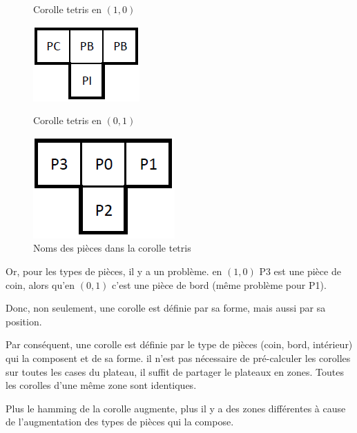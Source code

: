 \begin{exmp}
\begin{figure}[H]
\begin{minipage}{0.33\textwidth}
\begin{center}
					\caption{Corolle tetris en $(1,0)$}\label{fig:corolle_tetris_1}
					\includegraphics{images/corolle_tetris_2.png}
					\caption{Corolle tetris en $(0,1)$}\label{fig:corolle_tetris_2}
				\end{center}
			\end{minipage}\hfill
			\begin{minipage}{0.33\textwidth}
				\includegraphics{images/corolle_tetris.png}
				\caption{Noms des pièces dans la corolle tetris}\label{fig:corolle_tetris}
			\end{minipage}\hfill
		\end{figure}
		
		Or, pour les types de pièces, il y a un problème. en $(1,0)$ P3 est une pièce de coin, alors qu'en $(0,1)$ c'est une pièce de bord (même problème pour P1).
		
		Donc, non seulement, une corolle est définie par sa forme, mais aussi par sa position.
	\end{exmp}
	
	Par conséquent, une corolle est définie par le type de pièces (coin, bord, intérieur) qui la composent et de sa forme. il n'est pas nécessaire de pré-calculer les corolles sur toutes les cases du plateau, il suffit de partager le plateaux en zones. Toutes les corolles d'une même zone sont identiques.
	
	\begin{rem}
		Plus le hamming de la corolle augmente, plus il y a des zones différentes à cause de l'augmentation des types de pièces qui la compose.
	\end{rem}
	
